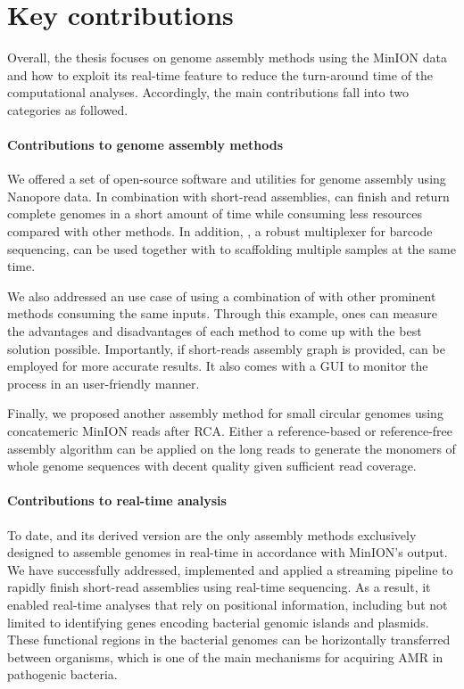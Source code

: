 \section{Key contributions}
Overall, the thesis focuses on genome assembly methods using the MinION data and how to exploit its real-time feature to reduce the turn-around time of the computational analyses.
Accordingly, the main contributions fall into two categories as followed.
\paragraph{Contributions to genome assembly methods}
We offered a set of open-source software and utilities for genome assembly using Nanopore data.
In combination with short-read assemblies, \npscarf{} can finish and return complete genomes in a short amount of time while consuming less resources compared with other methods.
In addition, \npbarcode{}, a robust multiplexer for barcode sequencing, can be used together with \npscarf{} to scaffolding multiple samples at the same time.

We also addressed an use case of using a combination of \npscarf{} with other prominent methods consuming the same inputs. Through this example, ones can measure the advantages and disadvantages of each method to come up with the best solution possible.
Importantly, if short-reads assembly graph is provided, \npgraph{} can be employed for more accurate results. It also comes with a GUI to monitor the process in an user-friendly manner.

Finally, we proposed another assembly method for small circular genomes using concatemeric MinION reads after RCA. Either a reference-based or reference-free assembly algorithm can be applied on the long reads to generate the monomers of whole genome sequences with decent quality given sufficient read coverage.
\paragraph{Contributions to real-time analysis}
To date, \npscarf{} and its derived version \npgraph{} are the only assembly methods exclusively designed to assemble genomes in real-time in accordance with MinION's output.
We have successfully addressed, implemented and applied a streaming pipeline to rapidly finish short-read assemblies using real-time sequencing.
As a result, it enabled real-time analyses that rely on positional information, including but not limited to identifying genes encoding bacterial genomic islands and plasmids.
These functional regions in the bacterial genomes can be horizontally transferred between organisms, which is one of the main mechanisms for acquiring AMR in pathogenic bacteria.  

